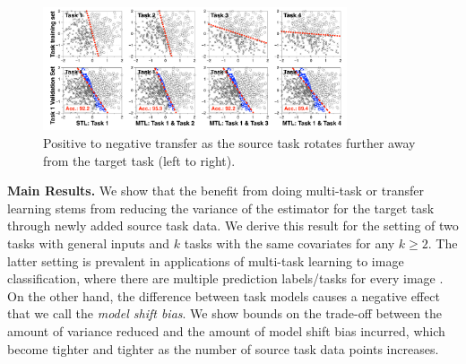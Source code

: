 \begin{figure}[!t]
	\centering
	\includegraphics[width=0.8\textwidth]{figures/model_distance_motivation.pdf}
	\caption{Positive to negative transfer as the source task rotates further away from the target task (left to right).}
	\label{fig_motivation}
\end{figure}




{\bf Main Results.}
	We show that the benefit from doing multi-task or transfer learning stems from reducing the variance of the estimator for the target task through newly added source task data.
	We derive this result for the setting of two tasks with general inputs and $k$ tasks with the same covariates for any $k \ge 2$.
	The latter setting is prevalent in applications of multi-task learning to image classification, where there are multiple prediction labels/tasks for every image \cite{EA20}.
	On the other hand, the difference between task models causes a negative effect that we call the \textit{model shift bias}.
	We show bounds on the trade-off between the amount of variance reduced and the amount of model shift bias incurred, which become tighter and tighter as the number of source task data points increases.

